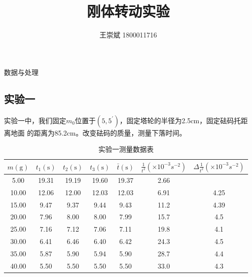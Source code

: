\documentclass[a4paper]{ctexart}
\title{\textbf{刚体转动实验}}
\author{王崇斌 1800011716}
\date{}
\makeatletter
\def\g{\mathrm{g}}
\def\s{\mathrm{s}}
\renewcommand{\section}{\@startsection{section}{1}{0mm}
	{-\baselineskip}{0.5\baselineskip}{\bf\leftline}}
\makeatother
\begin{document}
	\pagestyle{fancy}
	\chead{}
	\rhead{}
	\maketitle
	\thispagestyle{fancy}
    \section{\large{数据与处理}}
    \subsection{实验一}
    \par 
    实验一中，我们固定$m_{0}$位置于$(5,5^{'})$，固定塔轮的半径为2.5cm，固定砝码托距离地面
    的距离为85.2cm。改变砝码的质量，测量下落时间。
    \begin{table}[htbp]
        \centering
        \caption{实验一测量数据表}
        \begin{tabular}{ccccccc}
            \toprule[1.5pt]
            $m(\g)$ & $t_{1}(\s)$ & $t_{2}(\s)$ & $t_{3}(\s)$ & $\bar{t}(\s)$ & $\frac{1}{t^{2}}(\times 10^{-3}s^{-2})$ & $\Delta \frac{1}{t^{2}}(\times 10^{-3}s^{-2})$\\
            \midrule
            5.00 & 19.31 & 19.19 & 19.60 & 19.37 & 2.66 &  \\ 
            10.00 & 12.06 & 12.00 & 12.03 & 12.03 & 6.91 & 4.25 \\
            15.00 & 9.47 & 9.37 & 9.44 & 9.43 & 11.2 & 4.39 \\
            20.00 & 7.96 & 8.00 & 8.00 & 7.99 & 15.7 & 4.5 \\
            25.00 & 7.16 & 7.12 & 7.06 & 7.11 & 19.8 & 4.1 \\
            30.00 & 6.41 & 6.46 & 6.40 & 6.42 & 24.3 & 4.5 \\
            35.00 & 5.87 & 5.90 & 5.94 & 5.90 & 28.7 & 4.4 \\
            40.00 & 5.50 & 5.50 & 5.50 & 5.50 & 33.0 & 4.3 \\ 
            \bottomrule[1.5pt]
        \end{tabular}
    \end{table}
\end{document}
